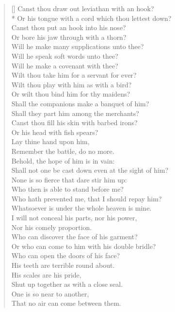 \documentclass[MAIN]{subfiles}
\begin{document}
\begin{verse}[\versewidth]
Canst thou draw out leviathan with an hook?\\*
\vin Or his tongue with a cord which thou lettest down?\\
Canst thou put an hook into his nose?\\
\vin Or bore his jaw through with a thorn?\\
Will he make many supplications unto thee?\\
\vin Will he speak soft words unto thee?\\
Will he make a covenant with thee?\\
\vin Wilt thou take him for a servant for ever?\\
Wilt thou play with him as with a bird?\\
\vin Or wilt thou bind him for thy maidens?\\
Shall the companions make a banquet of him?\\
\vin Shall they part him among the merchants?\\
Canst thou fill his skin with barbed irons?\\
\vin Or his head with fish spears?\\
Lay thine hand upon him,\\
\vin Remember the battle, do no more.\\
Behold, the hope of him is in vain:\\
\vin Shall not one be cast down even at the sight of him?\\
None is so fierce that dare stir him up:\\
\vin Who then is able to stand before me?\\
Who hath prevented me, that I should repay him?\\
\vin Whatsoever is under the whole heaven is mine.\\
I will not conceal his parts, nor his power,\\
\vin Nor his comely proportion.\\
Who can discover the face of his garment?\\
\vin Or who can come to him with his double bridle?\\
Who can open the doors of his face?\\
\vin His teeth are terrible round about.\\
His scales are his pride,\\
\vin Shut up together as with a close seal.\\
One is so near to another,\\
\vin That no air can come between them.\\

\end{verse}
\end{document}
